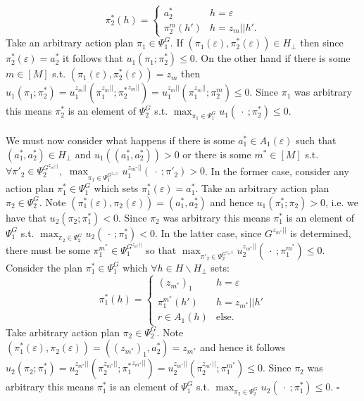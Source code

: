 \documentclass[11pt]{article}
\theoremstyle{definition}
\theoremstyle{plain}
\begin{document}
$$\pi^*_2(h)=\begin{cases}a_2^* & h=\varepsilon \\ \pi^m_2(h') & h=z_m||h'.\end{cases}$$
Take an arbitrary action plan $\pi_1 \in \Psi^G_1$. If $(\pi_1(\varepsilon),\pi^*_2(\varepsilon)) \in H_{\bot}$ then since $\pi^*_2(\varepsilon)=a^*_2$ it follows that $u_1(\pi_1;\pi^*_2) \leq 0$. On the other hand if there is some $m\in[M]$ s.t. $(\pi_1(\varepsilon),\pi^*_2(\varepsilon)) =z_m$ then $u_1(\pi_1;\pi^*_2)=u_1^{z_m||}(\pi_1^{z_m||}; {\pi^*_2}^{z_m||})=u_1^{z_m||}(\pi_1^{z_m||}; {\pi}^{m}_2) \leq 0$.  Since $\pi_1$ was arbitrary this means $\pi^*_2$ is an element of $\Psi_2^G$ s.t. $\max_{\pi_1 \in \Psi^G_1} u_1(\ \cdot \ ; \pi^*_2) \leq 0$.
\\
\\
We must now consider what happens if there is some $a_1^* \in A_1(\varepsilon)$ such that $(a^*_1,a_2^*) \in H_{\bot}$ and $u_1((a^*_1,a^*_2)) > 0$ or there is some $m^*\in [M]$ s.t. $\forall \pi'_2 \in \Psi^{G^{z_{m^*}||}}_2,$ $\max_{\pi_1 \in \Psi^{G^{z_{m^*}||}}_1} u^{z_{m^*}||}_1(\ \cdot \ ; \pi'_2)> 0$. In the former case, consider any action plan $\pi_1^* \in \Psi^G_1$ which sets $\pi_1^*(\varepsilon)=a_1^*$. Take an arbitrary action plan $\pi_2 \in \Psi_2^G$. Note $(\pi^*_1(\varepsilon),\pi_2(\varepsilon))=(a^*_1,a^*_2)$ and hence $u_1(\pi^*_1;\pi_2) > 0$, i.e. we have that $u_2(\pi_2; \pi^*_1) < 0$. Since $\pi_2$ was arbitrary this means $\pi^*_1$ is an element of $\Psi^G_1$ s.t.  $\max_{\pi_2 \in \Psi^G_2} u_2(\ \cdot \ ; \pi^*_1) < 0$. In the latter case, since $G^{z_{m^*}||}$ is determined, there must be some $\pi^{m^*}_1 \in \Psi^{G^{z_{m^*}||}}_1$ so that $\max_{\pi'_2 \in \Psi^{G^{z_{m^*}||}}_2} u^{z_{m^*}||}_2(\ \cdot \ ; \pi^{m^*}_1) \leq 0$. Consider the  plan $\pi^*_1 \in \Psi_1^G$ which $\forall h \in H\backslash H_{\bot}$ sets:
$$\pi^*_1(h)=\begin{cases} ({z_{m^*}})_1 & h=\varepsilon \\ \pi^{m^*}_1(h') & h=z_{m^*}||h'\\ r \in A_1(h) & \text{else}.\end{cases}$$
Take arbitrary action plan $\pi_2 \in \Psi_2^G$. Note $(\pi^*_1(\varepsilon),\pi_2(\varepsilon))=((z_{m^*})_1,a^*_2)=z_{m^*}$ and hence it follows $u_2(\pi_2; \pi^*_1)=u_2^{z_{m^*}||}(\pi_2^{z_{m^*}||};{\pi^*_1}^{z_{m^*}||})=u_2^{z_{m^*}||}(\pi_2^{z_{m^*}||};\pi^{m^*}_1) \leq 0$. Since $\pi_2$ was arbitrary this means $\pi^*_1$ is an element of $\Psi^G_1$ s.t. $\max_{\pi_2 \in \Psi^G_2} u_2(\ \cdot \ ; \pi^*_1) \leq 0$. $\square$
\end{document}
